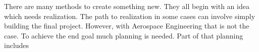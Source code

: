 There are many methods to create something new. They all begin with an idea which needs realization. The path to realization in some cases can involve simply building the final project. However, with Aerospace Engineering that is not the case. To achieve the end goal much planning is needed. Part of that planning includes 